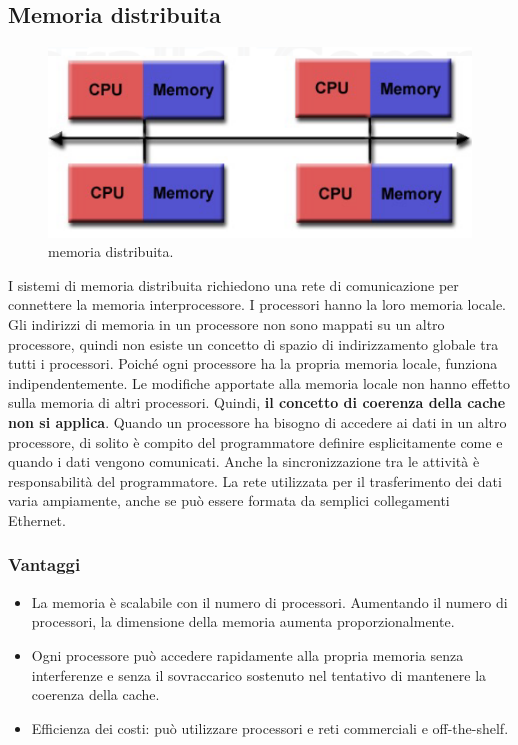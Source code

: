 \subsection{Memoria distribuita}
\begin{figure}[th]
	\centering
	\includegraphics[width=0.7\linewidth]{img/memoria-distribuita}
	\caption{memoria distribuita.}
	\label{fig:memoria-distribuita}
\end{figure}
I sistemi di memoria distribuita richiedono una rete di comunicazione per connettere la memoria interprocessore. I processori hanno la loro memoria locale. Gli indirizzi di memoria in un processore non sono mappati su un altro processore, quindi non esiste un concetto di spazio di indirizzamento globale tra tutti i processori. Poiché ogni processore ha la propria memoria locale, funziona
indipendentemente. Le modifiche apportate alla memoria locale non hanno
effetto sulla memoria di altri processori. Quindi, \textbf{il concetto di
coerenza della cache non si applica}.
Quando un processore ha bisogno di accedere ai dati in un altro processore,
di solito è compito del programmatore definire esplicitamente come
e quando i dati vengono comunicati. Anche la sincronizzazione tra le attività
è responsabilità del programmatore.
La rete utilizzata per il trasferimento dei dati varia ampiamente,
anche se può essere formata da semplici collegamenti Ethernet.

\subsubsection*{Vantaggi}
\begin{itemize}
	\item La memoria è scalabile con il numero di processori. Aumentando il numero di processori, la dimensione della memoria aumenta proporzionalmente. 
	\item Ogni processore può accedere rapidamente alla propria memoria senza
	interferenze e senza il sovraccarico sostenuto nel tentativo di
	mantenere la coerenza della cache.
	\item Efficienza dei costi: può utilizzare processori e reti commerciali e off-the-shelf.
\end{itemize}
